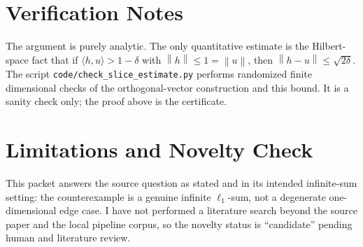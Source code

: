 \documentclass[11pt]{article}
\newcommand{\norm}[1]{\left\lVert #1 \right\rVert}
\begin{document}
\section*{Verification Notes}

The argument is purely analytic. The only quantitative estimate is the
Hilbert-space fact that if $\langle h,u\rangle>1-\delta$ with
$\norm{h}\le 1=\norm{u}$, then $\norm{h-u}\le \sqrt{2\delta}$. The script
\texttt{code/check\_slice\_estimate.py} performs randomized finite
dimensional checks of the orthogonal-vector construction and this bound.
It is a sanity check only; the proof above is the certificate.

\section*{Limitations and Novelty Check}

This packet answers the source question as stated and in its intended
infinite-sum setting: the counterexample is a genuine infinite
$\ell_1$-sum, not a degenerate one-dimensional edge case. I have not
performed a literature search beyond the source paper and the local
pipeline corpus, so the novelty status is ``candidate'' pending human
and literature review.
\end{document}
